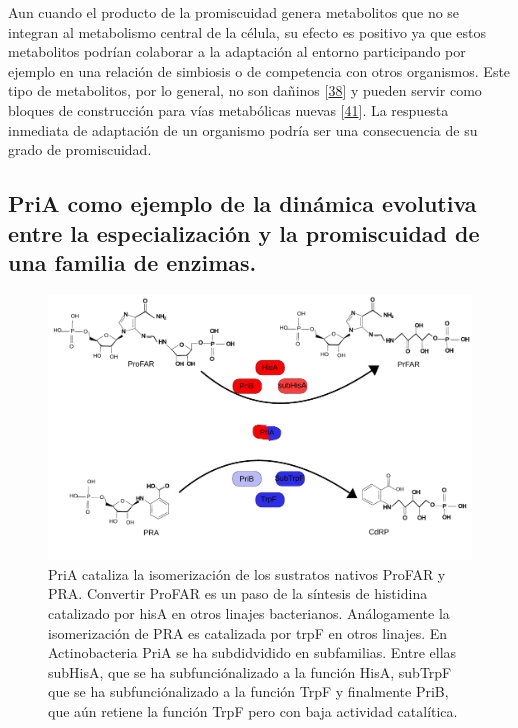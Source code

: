 \documentclass[12pt,twoside]{reedthesis}
\begin{document}
  Aun cuando el producto de la promiscuidad genera metabolitos que no se
  integran al metabolismo central de la célula, su efecto es positivo ya
  que estos metabolitos podrían colaborar a la adaptación al entorno
  participando por ejemplo en una relación de simbiosis o de competencia
  con otros organismos. Este tipo de metabolitos, por lo general, no son
  dañinos {[}\protect\hyperlink{ref-notebaart_network-level_2014}{38}{]} y
  pueden servir como bloques de construcción para vías metabólicas nuevas
  {[}\protect\hyperlink{ref-ma_unconventional_2013}{41}{]}. La respuesta
  inmediata de adaptación de un organismo podría ser una consecuencia de
  su grado de promiscuidad.
  
  \subsection{PriA como ejemplo de la dinámica evolutiva entre la
  especialización y la promiscuidad de una familia de
  enzimas.}\label{pria-como-ejemplo-de-la-dinamica-evolutiva-entre-la-especializacion-y-la-promiscuidad-de-una-familia-de-enzimas.}
  
  \begin{figure}[h!tbp]
  \centering
  \includegraphics[angle = 0,scale = 0.6]{PriA.pdf}
  \caption[PriA isomeriza los sustratos PRA y ProFAR ]{\footnotesize{PriA cataliza la isomerización  de los sustratos nativos ProFAR y PRA. Convertir ProFAR es un paso de la síntesis de histidina catalizado por {hisA} en otros linajes bacterianos. Análogamente la isomerización de PRA es catalizada por {trpF} en otros linajes. En Actinobacteria PriA se ha subdidvidido en subfamilias. Entre ellas subHisA, que se ha subfunciónalizado a la función HisA, subTrpF que se ha subfunciónalizado a la función TrpF y finalmente PriB, que aún retiene la función TrpF pero con baja actividad catalítica.  }}
  \label{fig:priAFigure}
  \end{figure}
  
\end{document}
